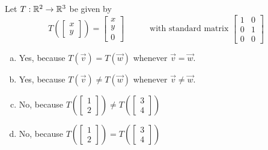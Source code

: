 \begin{activity}{2}
Let $T: \mathbb{R}^2 \rightarrow \mathbb{R}^3$ be given by
\[
  T\left(\begin{bmatrix}x \\ y \end{bmatrix} \right)
    =
  \begin{bmatrix} x \\ y \\ 0 \end{bmatrix}
    \hspace{3em}
    \text{with standard matrix }
  \begin{bmatrix} 1 & 0 \\ 0 & 1 \\ 0 & 0 \end{bmatrix}
\]
\begin{enumerate}[a)]
\item Yes, because \(T(\vec v)=T(\vec w)\) whenever \(\vec v=\vec w\).
\item Yes, because \(T(\vec v)\not=T(\vec w)\) whenever \(\vec v\not=\vec w\).
\item No, because 
  \(
    T\left(\begin{bmatrix}1\\2\end{bmatrix}\right)
      \not=
    T\left(\begin{bmatrix}3\\4\end{bmatrix}\right)
  \)
\item No, because 
  \(
    T\left(\begin{bmatrix}1\\2\end{bmatrix}\right)
      =
    T\left(\begin{bmatrix}3\\4\end{bmatrix}\right)
  \)
\end{enumerate}
\end{activity}

